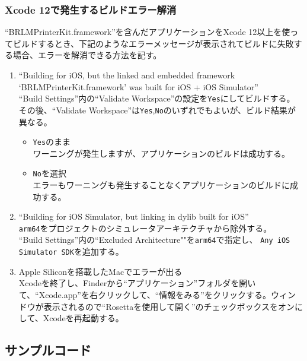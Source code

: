 \documentclass[dvipdfmx,jb5]{jreport}
\begin{document}
\subsubsection{Xcode 12で発生するビルドエラー解消}
``BRLMPrinterKit.framework''を含んだアプリケーションをXcode 12以上を使ってビルドするとき、下記のようなエラーメッセージが表示されてビルドに失敗する場合、エラーを解消できる方法を記す。
\begin{enumerate}[ケース1]
      \item ``Building for iOS, but the linked and embedded framework `BRLMPrinterKit.framework' was built for iOS + iOS Simulator''\\
            ``Build Settings''内の``Validate Workspace''の設定を\texttt{Yes}にしてビルドする。 \\
            その後、``Validate Workspace''は\texttt{Yes},\texttt{No}のいずれでもよいが、ビルド結果が異なる。
            \begin{itemize}
                  \item \texttt{Yes}のまま\\
                        ワーニングが発生しますが、アプリケーションのビルドは成功する。
                  \item \texttt{No}を選択\\
                        エラーもワーニングも発生することなくアプリケーションのビルドに成功する。
            \end{itemize}
      \item ``Building for iOS Simulator, but linking in dylib built for iOS''\\
            \texttt{arm64}をプロジェクトのシミュレータアーキテクチャから除外する。\\
            ``Build Settings''内の``Excluded Architecture""を\texttt{arm64}で指定し、 \texttt{Any iOS Simulator SDK}を追加する。
      \item Apple Siliconを搭載したMacでエラーが出る\\
            Xcodeを終了し、Finderから``アプリケーション''フォルダを開いて、``Xcode.app''を右クリックして、``情報をみる''をクリックする。ウィンドウが表示されるので``Rosettaを使用して開く''のチェックボックスをオンにして、Xcodeを再起動する。
\end{enumerate}
\subsection{サンプルコード}
\end{document}
